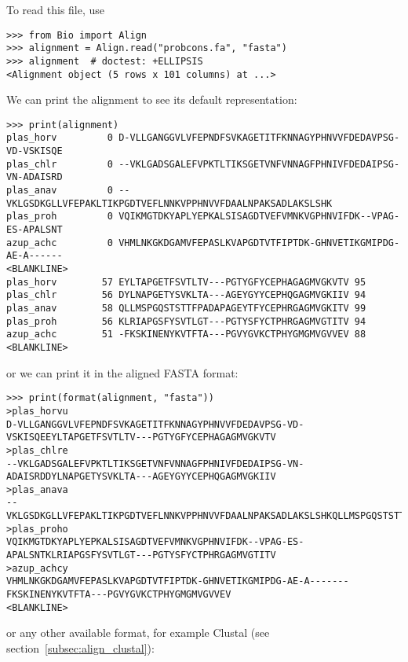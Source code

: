 To read this file, use
\begin{verbatim}
>>> from Bio import Align
>>> alignment = Align.read("probcons.fa", "fasta")
>>> alignment  # doctest: +ELLIPSIS
<Alignment object (5 rows x 101 columns) at ...>
\end{verbatim}
We can print the alignment to see its default representation:
\begin{verbatim}
>>> print(alignment)
plas_horv         0 D-VLLGANGGVLVFEPNDFSVKAGETITFKNNAGYPHNVVFDEDAVPSG-VD-VSKISQE
plas_chlr         0 --VKLGADSGALEFVPKTLTIKSGETVNFVNNAGFPHNIVFDEDAIPSG-VN-ADAISRD
plas_anav         0 --VKLGSDKGLLVFEPAKLTIKPGDTVEFLNNKVPPHNVVFDAALNPAKSADLAKSLSHK
plas_proh         0 VQIKMGTDKYAPLYEPKALSISAGDTVEFVMNKVGPHNVIFDK--VPAG-ES-APALSNT
azup_achc         0 VHMLNKGKDGAMVFEPASLKVAPGDTVTFIPTDK-GHNVETIKGMIPDG-AE-A------
<BLANKLINE>
plas_horv        57 EYLTAPGETFSVTLTV---PGTYGFYCEPHAGAGMVGKVTV 95
plas_chlr        56 DYLNAPGETYSVKLTA---AGEYGYYCEPHQGAGMVGKIIV 94
plas_anav        58 QLLMSPGQSTSTTFPADAPAGEYTFYCEPHRGAGMVGKITV 99
plas_proh        56 KLRIAPGSFYSVTLGT---PGTYSFYCTPHRGAGMVGTITV 94
azup_achc        51 -FKSKINENYKVTFTA---PGVYGVKCTPHYGMGMVGVVEV 88
<BLANKLINE>
\end{verbatim}
or we can print it in the aligned FASTA format:
\begin{verbatim}
>>> print(format(alignment, "fasta"))
>plas_horvu
D-VLLGANGGVLVFEPNDFSVKAGETITFKNNAGYPHNVVFDEDAVPSG-VD-VSKISQEEYLTAPGETFSVTLTV---PGTYGFYCEPHAGAGMVGKVTV
>plas_chlre
--VKLGADSGALEFVPKTLTIKSGETVNFVNNAGFPHNIVFDEDAIPSG-VN-ADAISRDDYLNAPGETYSVKLTA---AGEYGYYCEPHQGAGMVGKIIV
>plas_anava
--VKLGSDKGLLVFEPAKLTIKPGDTVEFLNNKVPPHNVVFDAALNPAKSADLAKSLSHKQLLMSPGQSTSTTFPADAPAGEYTFYCEPHRGAGMVGKITV
>plas_proho
VQIKMGTDKYAPLYEPKALSISAGDTVEFVMNKVGPHNVIFDK--VPAG-ES-APALSNTKLRIAPGSFYSVTLGT---PGTYSFYCTPHRGAGMVGTITV
>azup_achcy
VHMLNKGKDGAMVFEPASLKVAPGDTVTFIPTDK-GHNVETIKGMIPDG-AE-A-------FKSKINENYKVTFTA---PGVYGVKCTPHYGMGMVGVVEV
<BLANKLINE>
\end{verbatim}
or any other available format, for example Clustal (see section~\ref{subsec:align_clustal}):
